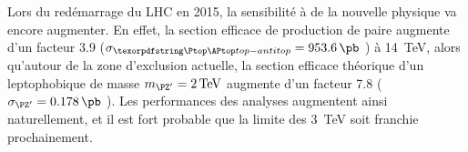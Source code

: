 \bigskip

Lors du redémarrage du LHC en 2015, la sensibilité à de la nouvelle physique va encore augmenter. En effet, la section efficace de production de paire \ttbar augmente d'un facteur \num{3,9} ($\sigma_{\ttbar} = \SI{953.6}{\pb}$ \citep{Czakon:2013goa}) à \SI{14}{\TeV}, alors qu'autour de la zone d'exclusion actuelle, la section efficace théorique d'un \zprime leptophobique de masse $\mzp = \SI{2}{\TeV}$ augmente d'un facteur \num{7.8} ($\sigma_{\zprime} = \SI{0.178}{\pb}$ \citep{Harris:2011ez}). Les performances des analyses augmentent ainsi naturellement, et il est fort probable que la limite des \SI{3}{\TeV} soit franchie prochainement.